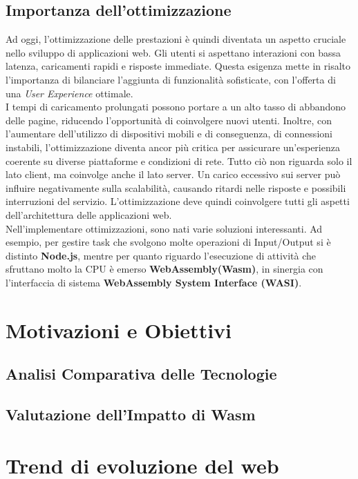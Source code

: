 \subsection{Importanza dell'ottimizzazione}
Ad oggi, l'ottimizzazione delle prestazioni è quindi diventata un aspetto cruciale nello sviluppo di applicazioni web. Gli utenti si aspettano interazioni con bassa latenza, caricamenti rapidi e risposte immediate. Questa esigenza mette in risalto l'importanza di bilanciare l'aggiunta di funzionalità sofisticate, con l'offerta di una \emph{User Experience} ottimale.
\\I tempi di caricamento prolungati possono portare a un alto tasso di abbandono delle pagine, riducendo l'opportunità di coinvolgere nuovi utenti. Inoltre, con l'aumentare dell'utilizzo di dispositivi mobili e di conseguenza, di connessioni instabili, l'ottimizzazione diventa ancor più critica per assicurare un'esperienza coerente su diverse piattaforme e condizioni di rete.
Tutto ciò non riguarda solo il lato client, ma coinvolge anche il lato server. Un carico eccessivo sui server può influire negativamente sulla scalabilità, causando ritardi nelle risposte e possibili interruzioni del servizio. L'ottimizzazione deve quindi coinvolgere tutti gli aspetti dell'architettura delle applicazioni web.
\\Nell'implementare ottimizzazioni, sono nati varie soluzioni interessanti. Ad esempio, per gestire task che svolgono molte operazioni di Input/Output si è distinto \textbf{Node.js}, mentre per quanto riguardo l'esecuzione di attività che sfruttano molto la CPU è emerso \textbf{WebAssembly(Wasm)}, in sinergia con l'interfaccia di sistema \textbf{WebAssembly System Interface (WASI)}.

\newpage
\section{Motivazioni e Obiettivi}
\label{sec:Obiettivi}
\subsection{Analisi Comparativa delle Tecnologie}
\subsection{Valutazione dell'Impatto di Wasm}




\section{Trend di evoluzione del web}
\label{sec:Trend}
